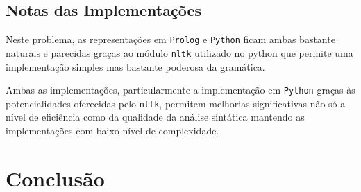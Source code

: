 \documentclass[12pt,a4paper,oneside]{article}
\begin{document}
\subsection{Notas das Implementações}

Neste problema, as representações em \texttt{Prolog} e \texttt{Python} ficam ambas bastante
naturais e parecidas graças ao módulo \texttt{nltk} utilizado no python que permite uma
implementação simples mas bastante poderosa da gramática.

Ambas as implementações, particularmente a implementação em \texttt{Python} graças às
potencialidades oferecidas pelo \texttt{nltk}, permitem melhorias significativas não só a
nível de eficiência como da qualidade da análise sintática mantendo as implementações com
baixo nível de complexidade.



\section{Conclusão}
\label{sec:conc}

\lipsum[1]

\lipsum[2]



\end{document}
